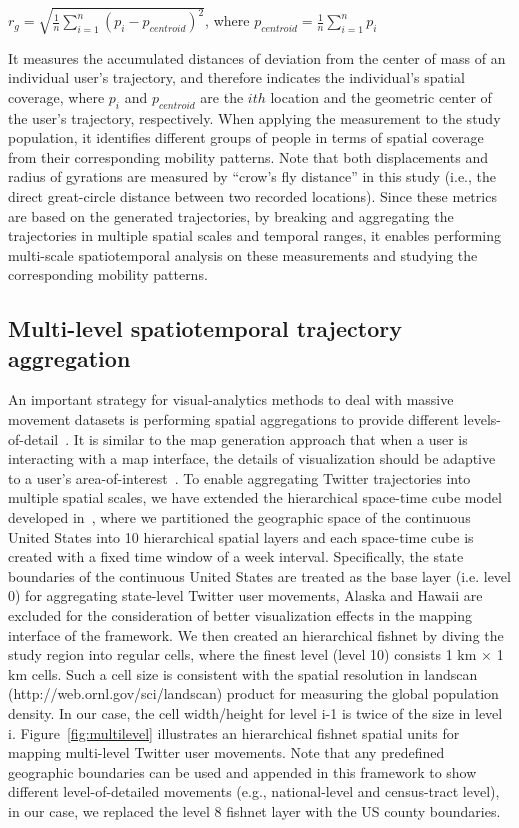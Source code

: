 \documentclass[ijgi,article,accept,moreauthors,pdftex,10pt,a4paper]{mdpi}
\theoremstyle{mdpi}
\newcounter{ex}
\newcounter{re}
\theoremstyle{mdpidefinition}
\begin{document}
$r_{g} = \sqrt{\frac{1}{n}\sum_{i=1}^{n}(p_{i} - p_{centroid})^{2}}$, where $p_{centroid} = \frac{1}{n}\sum_{i=1}^{n}p_{i}$
\newline

\noindent It measures the accumulated distances of deviation from the center of mass of an individual user's trajectory, and therefore indicates the individual's spatial coverage, where $p_{i}$ and $p_{centroid}$ are the $ith$ location and the geometric center of the user's trajectory, respectively.
When applying the measurement to the study population, it identifies different groups of people in terms of spatial coverage from their corresponding mobility patterns. Note that both displacements and radius of gyrations are measured by ``crow's fly distance'' in this study (i.e., the direct great-circle distance between two recorded locations).
Since these metrics are based on the generated trajectories, by breaking and aggregating the trajectories in multiple spatial scales and temporal ranges, it enables performing multi-scale spatiotemporal analysis on these measurements and studying the corresponding mobility patterns. 

\subsection{Multi-level spatiotemporal trajectory aggregation}
An important strategy for visual-analytics methods to deal with massive movement datasets is performing spatial aggregations to provide different levels-of-detail~\cite{andrienko2007designing,andrienko2007visual}.
It is similar to the map generation approach that when a user is interacting with a map interface, the details of visualization should be adaptive to a user's area-of-interest~\cite{buttenfield1991map}.
To enable aggregating Twitter trajectories into multiple spatial scales, we have extended the hierarchical space-time cube model developed in~\cite{cao2014scalable}, where we partitioned the geographic space of the continuous United States into 10 hierarchical spatial layers and each space-time cube is created with a fixed time window of a week interval. 
Specifically, the state boundaries of the continuous United States are treated as the base layer (i.e. level 0) for aggregating state-level Twitter user movements, Alaska and Hawaii are excluded for the consideration of better visualization effects in the mapping interface of the framework.
We then created an hierarchical fishnet by diving the study region into regular cells, where the finest level (level 10) consists 1 km $\times$ 1 km cells.
Such a cell size is consistent with the spatial resolution in landscan (http://web.ornl.gov/sci/landscan) product for measuring the global population density.
In our case, the cell width/height for level i-1 is twice of the size in level i.
Figure~\ref{fig:multilevel} illustrates an hierarchical fishnet spatial units for mapping multi-level Twitter user movements.
Note that any predefined geographic boundaries can be used and appended in this framework to show different level-of-detailed movements (e.g., national-level and census-tract level), in our case, we replaced the level 8 fishnet layer with the US county boundaries.
\end{document}

